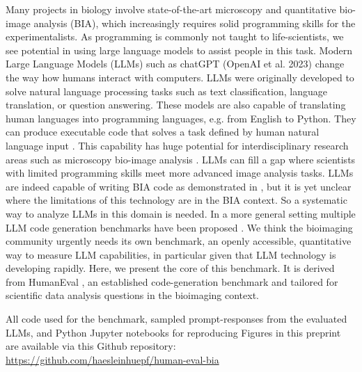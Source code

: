 \documentclass{ecai}
\begin{document}
Many projects in biology involve state-of-the-art microscopy and quantitative bio-image analysis (BIA), which increasingly requires solid programming skills for the experimentalists. As programming is commonly not taught to life-scientists, we see potential in using large language models to assist people in this task. Modern Large Language Models (LLMs) such as chatGPT (OpenAI et al. 2023) change the way how humans interact with computers. LLMs were originally developed to solve natural language processing tasks such as text classification, language translation, or question answering. These models are also capable of translating human languages into programming languages, e.g. from English to Python. They can produce executable code that solves a task defined by human natural language input \citep{brown2020language}. This capability has huge potential for interdisciplinary research areas such as microscopy bio-image analysis \citep{Royer2023}. LLMs can fill a gap where scientists with limited programming skills meet more advanced image analysis tasks. LLMs are indeed capable of writing BIA code as demonstrated in \citep{royer2023omega}, but it is yet unclear where the limitations of this technology are in the BIA context. So a systematic way to analyze LLMs in this domain is needed. In a more general setting multiple LLM code generation benchmarks have been proposed \citep{chen2021evaluating,austin2021,lai2022ds1000,yadav2024pythonsaga,hendrycks2021measuring}. We think the bioimaging community urgently needs its own benchmark, an openly accessible, quantitative way to measure LLM capabilities, in particular given that LLM technology is developing rapidly. Here, we present the core of this benchmark. It is derived from HumanEval \citep{chen2021evaluating}, an established code-generation benchmark and tailored for scientific data analysis questions in the bioimaging context.

\begin{blind}
All code used for the benchmark, sampled prompt-responses from the evaluated LLMs, and Python Jupyter notebooks for reproducing Figures in this preprint are available via this Github repository:
   \url{https://github.com/haesleinhuepf/human-eval-bia}
\end{blind}
\end{document}
